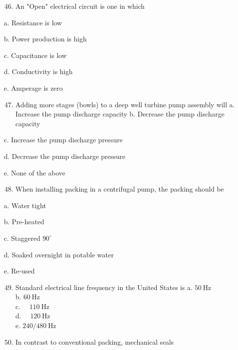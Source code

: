 \documentclass[10pt]{article}
\begin{document}
\begin{enumerate}
\begin{enumerate}
\begin{enumerate}
  \setcounter{enumi}{45}
  \item An "Open" electrical circuit is one in which
\end{enumerate}

a. Resistance is low

b. Power production is high

c. Capacitance is low

d. Conductivity is high

e. Amperage is zero

\begin{enumerate}
  \setcounter{enumi}{46}
  \item Adding more stages (bowls) to a deep well turbine pump assembly will a. Increase the pump discharge capacity b. Decrease the pump discharge capacity
\end{enumerate}

c. Increase the pump discharge pressure

d. Decrease the pump discharge pressure

e. None of the above

\begin{enumerate}
  \setcounter{enumi}{47}
  \item When installing packing in a centrifugal pump, the packing should be
\end{enumerate}

a. Water tight

b. Pre-heated

c. Staggered $90^{\circ}$

d. Soaked overnight in potable water

e. Re-used

\begin{enumerate}
  \setcounter{enumi}{48}
  \item Standard electrical line frequency in the United States is
a. $50 \mathrm{~Hz}$\\
b. $60 \mathrm{~Hz}$\\
c. $\quad 110 \mathrm{~Hz}$\\
d. $\quad 120 \mathrm{~Hz}$\\
e. $240 / 480 \mathrm{~Hz}$\\

  \item In contrast to conventional packing, mechanical seals\\

\end{enumerate}


\end{enumerate}
\end{enumerate}
\end{document}
